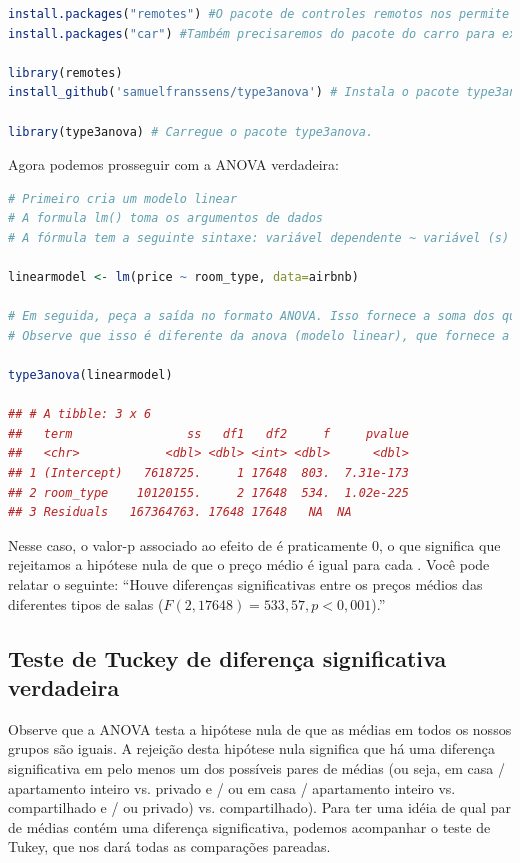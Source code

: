 \documentclass{article}
\begin{document}
\begin{lstlisting}[language=R]
install.packages("remotes") #O pacote de controles remotos nos permite instalar pacotes armazenados no GitHub, um site para desenvolvedores de pacotes. 
install.packages("car") #Também precisaremos do pacote do carro para executar a ANOVA (não é necessário reinstalá-lo se você já tiver feito isso).

library(remotes)
install_github('samuelfranssens/type3anova') # Instala o pacote type3anova. Esta e as etapas anteriores precisam ser executadas apenas uma vez.

library(type3anova) # Carregue o pacote type3anova.
\end{lstlisting}

Agora podemos prosseguir com a ANOVA verdadeira:

\begin{lstlisting}[language=R]
# Primeiro cria um modelo linear
# A formula lm() toma os argumentos de dados 
# A fórmula tem a seguinte sintaxe: variável dependente ~ variável (s) independente

linearmodel <- lm(price ~ room_type, data=airbnb) 

# Em seguida, peça a saída no formato ANOVA. Isso fornece a soma dos quadrados do Tipo III. 
# Observe que isso é diferente da anova (modelo linear), que fornece a soma dos quadrados do tipo I.

type3anova(linearmodel) 

## # A tibble: 3 x 6
##   term                ss   df1   df2     f     pvalue
##   <chr>            <dbl> <dbl> <int> <dbl>      <dbl>
## 1 (Intercept)   7618725.     1 17648  803.  7.31e-173
## 2 room_type    10120155.     2 17648  534.  1.02e-225
## 3 Residuals   167364763. 17648 17648   NA  NA
\end{lstlisting}

Nesse caso, o valor-p associado ao efeito de  é praticamente 0, o que significa que rejeitamos a hipótese nula de que o preço médio é igual para cada . Você pode relatar o seguinte: “Houve diferenças significativas entre os preços médios das diferentes tipos de salas ($F (2, 17648) = 533,57, p <0,001$).”

\subsection{Teste de Tuckey de diferença significativa verdadeira}

Observe que a ANOVA testa a hipótese nula de que as médias em todos os nossos grupos são iguais. A rejeição desta hipótese nula significa que há uma diferença significativa em pelo menos um dos possíveis pares de médias (ou seja, em casa / apartamento inteiro vs. privado e / ou em casa / apartamento inteiro vs. compartilhado e / ou privado) vs. compartilhado). Para ter uma idéia de qual par de médias contém uma diferença significativa, podemos acompanhar o teste de Tukey, que nos dará todas as comparações pareadas.
\end{document}
